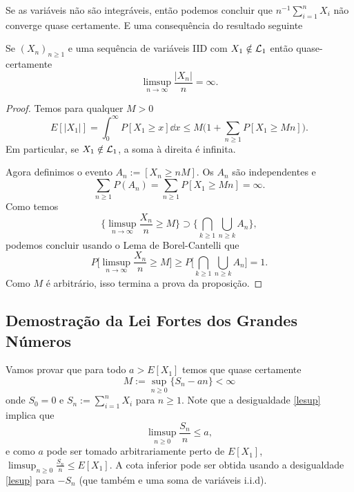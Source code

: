 Se as variáveis não são integráveis, então podemos concluir que $n^{-1}\sum_{i=1}^n X_i$ não converge quase certamente.
E uma consequência do resultado seguinte

\begin{proposition}
  Se $(X_n)_{n\ge 1}$ e uma sequência de variáveis IID com $X_1\notin {\ensuremath{\mathcal L}}_1$ então quase-certamente
  \begin{equation}
    \limsup_{n\to \infty} \frac{|X_n|}{n}=\infty.
  \end{equation}
\end{proposition}

\begin{proof}
  Temos para qualquer $M>0$
  \begin{equation}
    E[|X_1|]=\int_0^{\infty} P[X_1\ge x] \dd x \le  M
    \bigg(1+ \sum_{n\ge 1} P[X_1\ge Mn]\bigg).
  \end{equation}
  Em particular, se $X_1 \notin {\ensuremath{\mathcal L}}_1$, a soma à direita é infinita.

  Agora definimos o evento $A_n:= [X_n\ge nM]$.
  Os $A_n$ são independentes e
  \begin{equation}
    \sum_{n\ge 1} P(A_n) = \sum_{n\ge 1} P[X_1\ge Mn]=\infty.
  \end{equation}
  Como temos
  \begin{equation}
    \bigg\{ \limsup_{n\to \infty} \frac{X_n}{n}\ge M \bigg\} \supset \bigg\{  \bigcap_{k\ge 1} \bigcup_{n\ge k} A_n \bigg\},
  \end{equation}
  podemos concluir usando o Lema de Borel-Cantelli que
  \begin{equation}
    P\bigg[ \limsup_{n\to \infty} \frac{X_n}{n}\ge M\bigg]\ge P \bigg[ \bigcap_{k\ge 1} \bigcup_{n\ge k} A_n  \bigg] =1.
  \end{equation}
  Como $M$ é arbitrário, isso termina a prova da proposição.
\end{proof}

\subsection{Demostração da Lei Fortes dos Grandes Números}

Vamos provar que para todo $a>E[X_1]$ temos que quase certamente
\begin{equation}\label{lesup}
M := \sup_{n\ge 0} \big\{ S_n - an \big\} < \infty
\end{equation}
onde $S_0 = 0$ e $S_n := \sum_{i = 1}^n X_i$ para $n \geq 1$.
Note que a desigualdade \eqref{lesup} implica que
\begin{equation*}
  \limsup_{n\ge 0} \frac{S_n}{n}\le a,
\end{equation*}
e como $a$ pode ser tomado arbitrariamente perto de $E[X_1]$,  $\limsup_{n\ge 0} \frac{S_n}{n}\le E[X_1]$.
A cota inferior pode ser obtida usando a desigualdade \eqref{lesup} para $-S_n$ (que também e uma soma de variáveis i.i.d).


